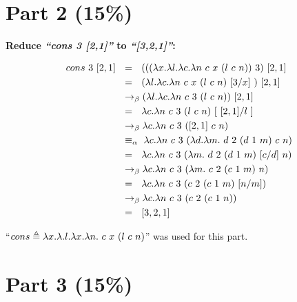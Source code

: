 \documentclass{article}
\begin{document}
	
		
	\section{Part 2 (15\%)}
	
	\begin{Large}
	
		\textbf{Reduce \textit{``cons 3 [2,1]''} to \textit{``[3,2,1]''}:}
		
		\begin{align*}
			cons \ 3 \ [2,1] \saq &= \saq (((\la x.\la l.\la c.\la n \ c \ x \ (l \ c \ n))\ 3) \ [2,1] \\
			&= \saq (\la l.\la c.\la n \ c \ x \ (l \ c \ n) \ [3/x] \ ) \ [2,1] \\
			&\equals (\la l.\la c.\la n \ c \ 3 \ (l \ c \ n)) \ [2,1] \\
			&= \saq \la c.\la n \ c \ 3 \ (l \ c \ n) \ [ \ [2,1] / l \ ] \\
			&\equals \la c.\la n \ c \ 3 \ ([2,1] \ c \ n) \\
			&\equiv_\alpha \, \, \la c.\la n \ c \ 3 \ (\la d.\la m. \ d \ 2 \ (d \ 1 \ m) \ c \ n) \\
			&= \saq \la c.\la n \ c \ 3 \ (\la m. \ d \ 2 \ (d \ 1 \ m) \ [c/d] \ n) \\
			&\equals \la c.\la n \ c \ 3 \ (\la m. \ c \ 2 \ (c \ 1 \ m) \ n) \\
			&= \saq \la c.\la n \ c \ 3 \ ( c \ 2 \ (c \ 1 \ m) \ [n/m]) \\
			&\equals \la c.\la n \ c \ 3 \ ( c \ 2 \ (c \ 1 \ n)) \\
			&= \saq [3,2,1]
		\end{align*}
		\newline
		
		``$cons \triangleq \lambda x.\lambda .l.\lambda x.\lambda n. \ c \ x \ (l \ c \ n)$'' was used for this part.
		
	\end{Large}
	\newpage
	
	
	
	\section{Part 3 (15\%)}
\end{document}
